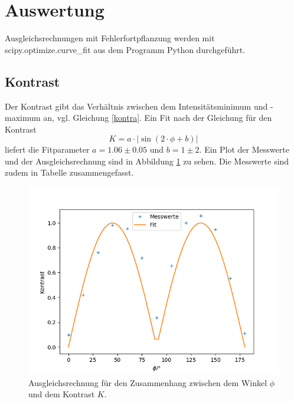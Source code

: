 \section{Auswertung}

Ausgleichsrechnungen mit Fehlerfortpflanzung werden mit scipy.optimize.curve\_fit aus dem Programm
Python durchgeführt.

\subsection{Kontrast}

Der Kontrast gibt das Verhältnis zwischen dem Intensitätsminimum und -maximum an, vgl. Gleichung
\ref{kontra}. Ein Fit nach der Gleichung für den Kontrast
\[
K = a \cdot | \sin (2 \cdot \phi + b) |
\]
liefert die Fitparameter $a = 1.06 \pm 0.05$ und $b = 1 \pm 2$. Ein Plot der Messwerte und der
Ausgleichsrechnung sind in Abbildung \ref{kontrast} zu sehen. Die Messwerte sind zudem in Tabelle
zusammengefasst.

\begin{figure}[h]
\centering
\includegraphics[width=\linewidth]{img/kontrast.png}
\caption{Ausgleichsrechnung für den Zusammenhang zwischen dem Winkel $\phi$ und dem Kontrast $K$.}
\label{kontrast}
\end{figure}


